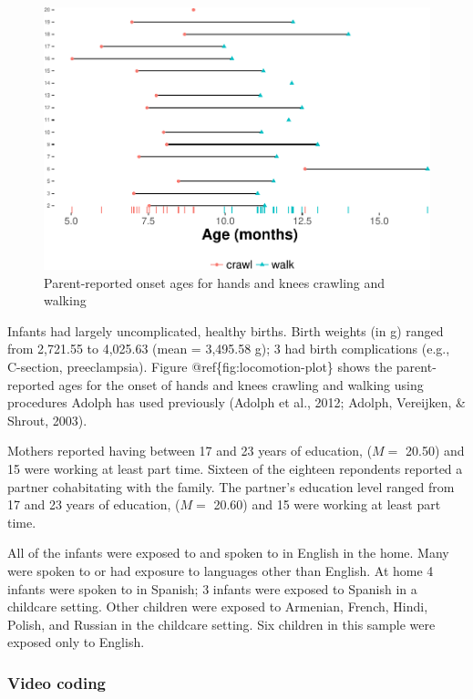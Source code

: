 \documentclass[english,man]{apa6}
\theoremstyle{definition}
\theoremstyle{definition}
\theoremstyle{definition}
\theoremstyle{remark}
\begin{document}
\begin{figure}

{\centering \includegraphics{ibad-ms_files/figure-latex/locomotion-plot-1} 

}

\caption{Parent-reported onset ages for hands and knees crawling and walking}\label{fig:locomotion-plot}
\end{figure}

Infants had largely uncomplicated, healthy births. Birth weights (in g)
ranged from 2,721.55 to 4,025.63 (mean = 3,495.58 g); 3 had birth
complications (e.g., C-section, preeclampsia). Figure
@ref\{fig:locomotion-plot\} shows the parent-reported ages for the onset
of hands and knees crawling and walking using procedures Adolph has used
previously (Adolph et al., 2012; Adolph, Vereijken, \& Shrout, 2003).

Mothers reported having between 17 and 23 years of education, (\(M=\)
20.50) and 15 were working at least part time. Sixteen of the eighteen
repondents reported a partner cohabitating with the family. The
partner's education level ranged from 17 and 23 years of education,
(\(M=\) 20.60) and 15 were working at least part time.

All of the infants were exposed to and spoken to in English in the home.
Many were spoken to or had exposure to languages other than English. At
home 4 infants were spoken to in Spanish; 3 infants were exposed to
Spanish in a childcare setting. Other children were exposed to Armenian,
French, Hindi, Polish, and Russian in the childcare setting. Six
children in this sample were exposed only to English.

\subsubsection{Video coding}\label{video-coding}
\end{document}
